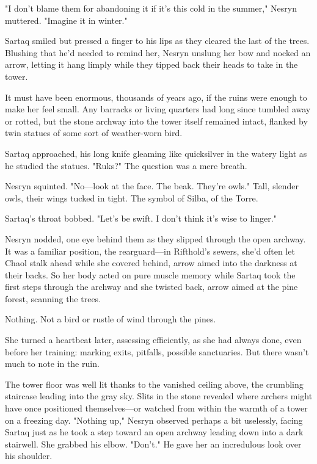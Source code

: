 "I don't blame them for abandoning it if it's this cold in the summer," Nesryn muttered.
"Imagine it in winter."

Sartaq smiled but pressed a finger to his lips as they cleared the last of the trees.
Blushing that he'd needed to remind her, Nesryn unslung her bow and nocked an arrow, letting it hang limply while they tipped back their heads to take in the tower.

It must have been enormous, thousands of years ago, if the ruins were enough to make her feel small.
Any barracks or living quarters had long since tumbled away or rotted, but the stone archway into the tower itself remained intact, flanked by twin statues of some sort of weather-worn bird.

Sartaq approached, his long knife gleaming like quicksilver in the watery light as he studied the statues.
"Ruks?"
The question was a mere breath.

Nesryn squinted.
"No---look at the face.
The beak.
They're 
owls."
Tall, slender owls, their wings tucked in tight.
The symbol of Silba, of the Torre.

Sartaq's throat bobbed.
"Let's be swift.
I don't think it's wise to linger."

Nesryn nodded, one eye behind them as they slipped through the open archway.
It was a familiar position, the rearguard---in Rifthold's sewers, she'd often let Chaol stalk ahead while she covered behind, arrow aimed into the darkness at their backs.
So her body acted on pure muscle memory while Sartaq took the first steps through the archway and she twisted back, arrow aimed at the pine forest, scanning the trees.

Nothing.
Not a bird or rustle of wind through the pines.

She turned a heartbeat later, assessing efficiently, as she had always done, even before her training: marking exits, pitfalls, possible sanctuaries.
But there wasn't much to note in the ruin.

The tower floor was well lit thanks to the vanished ceiling above, the crumbling staircase leading into the gray sky.
Slits in the stone revealed where archers might have once positioned themselves---or watched from within the warmth of a tower on a freezing day.
"Nothing up," Nesryn observed perhaps a bit uselessly, facing Sartaq just as he took a step toward an open archway leading down into a dark stairwell.
She grabbed his elbow.
"Don't."
He gave her an incredulous look over his shoulder.

